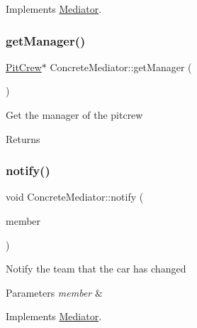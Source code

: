 Implements \mbox{\hyperlink{class_mediator_af3c7f586db4b837962101612555caf6f}{Mediator}}.

\mbox{\label{class_concrete_mediator_ab205ed278eb15b884e4d9441992b5b20}} 
\subsubsection{\texorpdfstring{get\+Manager()}{getManager()}}
{\footnotesize\ttfamily \mbox{\hyperlink{class_pit_crew}{Pit\+Crew}}$\ast$ Concrete\+Mediator\+::get\+Manager (\begin{DoxyParamCaption}{ }\end{DoxyParamCaption})\hspace{0.3cm}{\ttfamily [inline]}}

Get the manager of the pitcrew \begin{DoxyReturn}{Returns}

\end{DoxyReturn}
\mbox{\label{class_concrete_mediator_aea62657783ed54f1152fe129e4adc8d3}} 
\subsubsection{\texorpdfstring{notify()}{notify()}}
{\footnotesize\ttfamily void Concrete\+Mediator\+::notify (\begin{DoxyParamCaption}\item[{\mbox{\hyperlink{class_pit_crew}{Pit\+Crew}} $\ast$}]{member }\end{DoxyParamCaption})\hspace{0.3cm}{\ttfamily [virtual]}}

Notify the team that the car has changed 
\begin{DoxyParams}{Parameters}
{\em member} & \\
\hline
\end{DoxyParams}


Implements \mbox{\hyperlink{class_mediator_acd0f8876148e8aef1f03a80072832bf8}{Mediator}}.

\mbox{\label{class_concrete_mediator_ac4a804e3f7f6a74240ae249cf1f315ec}} 
